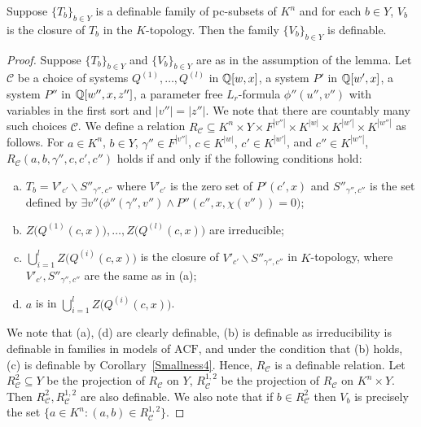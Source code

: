 \begin{lem} \label{DefinabilityOfClosure}
Suppose $\{T_b\}_{b \in Y}$ is a definable family of pc-subsets of $K^n$ and for each $b \in Y$, $V_b$ is the closure of $T_b$ in the $K$-topology. Then the family  $\{V_b\}_{b \in Y}$ is definable.

\end{lem}

\begin{proof}

Suppose $\{T_b\}_{b \in Y}$ and $\{V_b\}_{b \in Y}$ are as in the assumption of the lemma. Let $\mathscr{C}$ be a choice of systems $Q^{(1)}, \ldots, Q^{(l)}$  in $\mathbb{Q}[w,x]$, a system $P'$ in $\mathbb{Q}[w',x]$, a system $P''$ in $\mathbb{Q}[w'',x, z'']$, a parameter free $L_r$-formula $\phi''(u'',v'')$ with  variables in the first sort  and $|v''|=|z''|$. We note that there are countably many such choices $\mathscr{C}$. We define a relation $R_\mathscr{C} \subseteq K^n \times Y \times F^{|v''|} \times K^{|w|}\times K^{|w'|} \times K^{|w''|}$ as follows. For $a \in K^n$, $b \in Y$, $\gamma'' \in F^{|v''|}$, $c \in K^{|w|}$, $c' \in K^{|w'|}$, and $c'' \in K^{|w''|}$, $R_\mathscr{C}(a, b, \gamma'', c, c', c'')$ holds if and only if the following conditions hold:
\begin{enumerate}[(a)]
\item $T_b = V'_{c'} \backslash S''_{ \gamma'', c''}$ where $V'_{c'}$ is the zero set of $P'(c',x)$ and $S''_{\gamma'', c''}$ is the set defined by $\exists v''\big( \phi''(\gamma'', v'') \wedge P''(c'', x, \chi(v'')) =0\big)$;
\item $Z\big( Q^{(1)}(c, x)\big), \ldots, Z\big( Q^{(l)}(c, x)\big) $ are irreducible;
\item $\bigcup_{i=1}^l Z\big( Q^{(i)}(c, x)\big) $ is the closure of $V'_{c'} \backslash S''_{\gamma'', c''}$ in $K$-topology, where $V'_{c'}, S''_{\gamma'', c''}$ are the same as in (a);
\item $a$ is in  $ \bigcup_{i=1}^l Z\Big( Q^{(i)}(c, x)\Big) $.
\end{enumerate}
We note that (a), (d) are clearly definable, (b) is definable as irreducibility is definable in families in models of $\text{ACF}$, and under the condition that (b) holds, (c) is definable by Corollary~\ref{Smallness4}. Hence, $R_\mathscr{C}$ is a definable relation. Let $R^2_\mathscr{C} \subseteq Y$ be the projection of $R_\mathscr{C}$ on $Y$, $R^{1,2}_\mathscr{C}$ be the projection of $R_\mathscr{C}$ on $K^n \times Y$. Then $R^2_\mathscr{C}, R^{1,2}_\mathscr{C} $ are also definable. We also note that  if  $b \in R^2_\mathscr{C}$ then $V_b$ is precisely the set $\big\{ a \in K^n : (a, b) \in R^{1,2}_\mathscr{C} \big\}$.


\end{proof}
